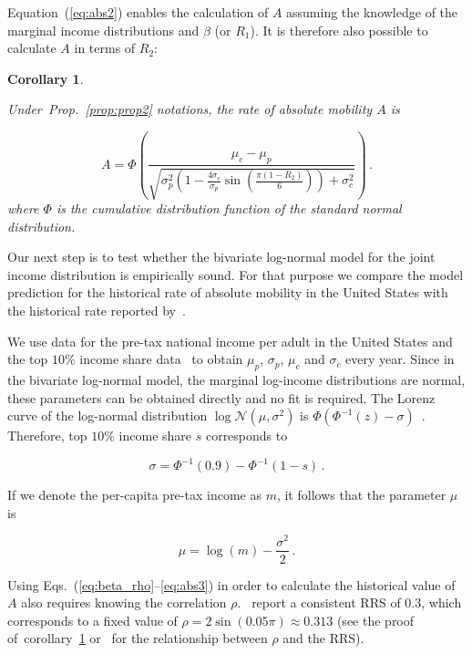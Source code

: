\documentclass[12pt,a4paper]{article}
\newtheorem{corollary}[theorem]{Corollary}
\newcommand{\elabel}[1]{\label{eq:#1}}
\newcommand{\Eref}[1]{Equation~(\ref{eq:#1})}
\newcommand{\pref}[1]{Prop.~\ref{prop:#1}}
\newcommand{\clabel}[1]{\label{coro:#1}}
\newcommand{\creflong}[1]{corollary~\ref{coro:#1}}
\newcommand{\be}{\begin{equation}}
\newcommand{\ee}{\end{equation}}
\numberwithin{equation}{section}
\begin{document}
\Eref{abs2} enables the calculation of $A$ assuming the knowledge of the marginal income distributions and $\beta$ (or $R_1$). It is therefore also possible to calculate $A$ in terms of $R_2$:

\begin{corollary}
\clabel{coro1}

Under~\pref{prop2} notations, the rate of absolute mobility $A$ is

\be
A = \Phi\left(\frac{\mu_c - \mu_p}{\sqrt{\sigma_p^2\left(1 - \frac{4\sigma_c}{\sigma_p}\sin{\left(\frac{\pi\left(1-R_2\right)}{6}\right)}\right) + \sigma_c^2}}\right) \,.
\elabel{abs3}
\ee
where $\Phi$ is the cumulative distribution function of the standard normal distribution.
\end{corollary}

Our next step is to test whether the bivariate log-normal model for the joint income distribution is empirically sound. For that purpose we compare the model prediction for the historical rate of absolute mobility in the United States with the historical rate reported by~\citet{chetty2017fading}.

We use data for the pre-tax national income per adult in the United States and the top $10\%$ income share data~\citep{WID2017} to obtain $\mu_p$, $\sigma_p$, $\mu_c$ and $\sigma_c$ every year. Since in the bivariate log-normal model, the marginal log-income distributions are normal, these parameters can be obtained directly and no fit is required. The Lorenz curve of the log-normal distribution $\log{\mathcal{N}}\left(\mu,\sigma^2\right)$ is $\Phi\left(\Phi^{-1}\left(z\right)-\sigma\right)$~\citep{cowell2011measuring}. Therefore, top $10\%$ income share $s$ corresponds to

\be
\sigma = \Phi^{-1}\left(0.9\right) - \Phi^{-1}\left(1-s\right)\,.
\ee

If we denote the per-capita pre-tax income as $m$, it follows that the parameter $\mu$ is

\be
\mu = \log{\left(m\right)} - \frac{\sigma^2}{2}\,.
\ee

Using Eqs.~(\ref{eq:beta_rho}--\ref{eq:abs3}) in order to calculate the historical value of $A$ also requires knowing the correlation $\rho$.~\citet{chetty2014united} report a consistent RRS of $0.3$, which corresponds to a fixed value of $\rho=2\sin{\left(0.05\pi\right)}\approx0.313$ (see the proof of~\creflong{coro1} or~\citet{trivedi2007copula} for the relationship between $\rho$ and the RRS).
\end{document}

